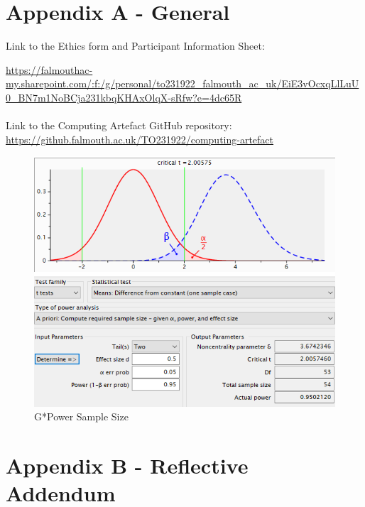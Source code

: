 \section*{Appendix A - General} \label{append:a}
Link to the Ethics form and Participant Information Sheet:

\url{https://falmouthac-my.sharepoint.com/:f:/g/personal/to231922_falmouth_ac_uk/EiE3vOcxqLlLuU0_BN7m1NoBCja231kbqKHAxOlqX-sRfw?e=4dc65R}
\\
\\
Link to the Computing Artefact GitHub repository: 
\url{https://github.falmouth.ac.uk/TO231922/computing-artefact}
\begin{figure}[ht]
    \includegraphics[width=\columnwidth]{./Images/gpower.png}
    \centering
    \caption{G*Power Sample Size}
    \label{gpower}
\end{figure}

\newpage
\section*{Appendix B - Reflective Addendum} \label{append:b}
